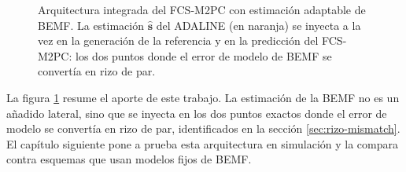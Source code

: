 \documentclass[../../../Tesis_JALS_Maestria.tex]{subfiles}
\begin{document}
\begin{figure}[htbp]
{%
    }
    \caption{Arquitectura integrada del FCS-M2PC con estimación adaptable de BEMF. La estimación $\hat{\mathbf{s}}$ del ADALINE (en naranja) se inyecta a la vez en la generación de la referencia y en la predicción del FCS-M2PC: los dos puntos donde el error de modelo de BEMF se convertía en rizo de par.}
    \label{fig:arquitectura}
\end{figure}

La figura \ref{fig:arquitectura} resume el aporte de este trabajo. La estimación de la BEMF no es un añadido lateral, sino que se inyecta en los dos puntos exactos donde el error de modelo se convertía en rizo de par, identificados en la sección \ref{sec:rizo-mismatch}. El capítulo siguiente pone a prueba esta arquitectura en simulación y la compara contra esquemas que usan modelos fijos de BEMF.
\end{document}
